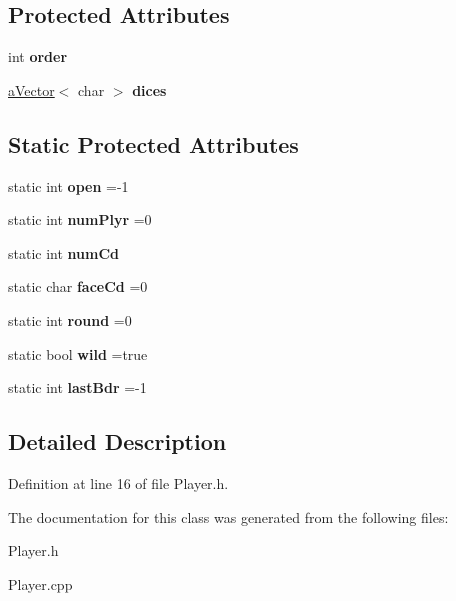 \subsection*{Protected Attributes}
\begin{DoxyCompactItemize}
\item 
\hypertarget{class_player_a4c5726c0fa6d1e409a03a0ed2a5d765c}{}int {\bfseries order}\label{class_player_a4c5726c0fa6d1e409a03a0ed2a5d765c}

\item 
\hypertarget{class_player_a6e10cf298d1dcb3dea7cc0a18cdf4754}{}\hyperlink{classa_vector}{a\+Vector}$<$ char $>$ {\bfseries dices}\label{class_player_a6e10cf298d1dcb3dea7cc0a18cdf4754}

\end{DoxyCompactItemize}
\subsection*{Static Protected Attributes}
\begin{DoxyCompactItemize}
\item 
\hypertarget{class_player_a1543aaf6b241f8bdf8ca6f8a647bf2d9}{}static int {\bfseries open} =-\/1\label{class_player_a1543aaf6b241f8bdf8ca6f8a647bf2d9}

\item 
\hypertarget{class_player_ad405eb8c39222c17a988993246a00cfb}{}static int {\bfseries num\+Plyr} =0\label{class_player_ad405eb8c39222c17a988993246a00cfb}

\item 
\hypertarget{class_player_a6bd02f63faf1415162da9539e107f12a}{}static int {\bfseries num\+Cd}\label{class_player_a6bd02f63faf1415162da9539e107f12a}

\item 
\hypertarget{class_player_a68a72e6cf75e11bdd6f196a9d81fadc7}{}static char {\bfseries face\+Cd} =\textquotesingle{}0\textquotesingle{}\label{class_player_a68a72e6cf75e11bdd6f196a9d81fadc7}

\item 
\hypertarget{class_player_adc8ed55c08d7ba0393cb806dea68f414}{}static int {\bfseries round} =0\label{class_player_adc8ed55c08d7ba0393cb806dea68f414}

\item 
\hypertarget{class_player_a0aa0b4001546e75caa519dcd68ff8200}{}static bool {\bfseries wild} =true\label{class_player_a0aa0b4001546e75caa519dcd68ff8200}

\item 
\hypertarget{class_player_ad4714edb523a78432863fc7e7521dc59}{}static int {\bfseries last\+Bdr} =-\/1\label{class_player_ad4714edb523a78432863fc7e7521dc59}

\end{DoxyCompactItemize}


\subsection{Detailed Description}


Definition at line 16 of file Player.\+h.



The documentation for this class was generated from the following files\+:\begin{DoxyCompactItemize}
\item 
Player.\+h\item 
Player.\+cpp\end{DoxyCompactItemize}
